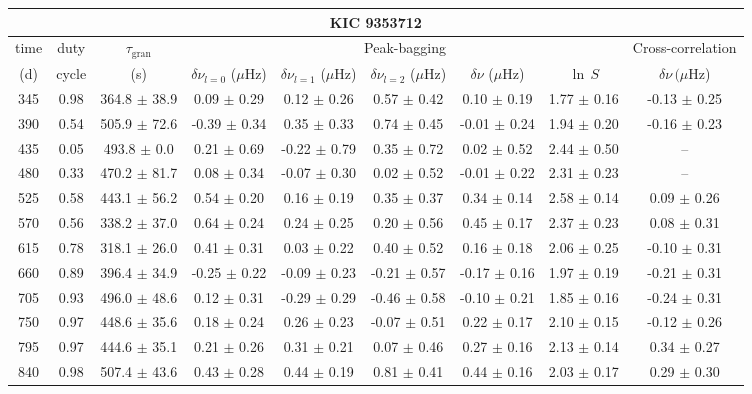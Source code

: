 \documentclass[twocolumn]{aastex61}%
\begin{document}
\begin{table*}[ht]\centering\fontsize{9.}{7.}\selectfont
\begin{tabular}{ccc|ccccc|c}
\multicolumn{9}{c}{KIC 9353712}\\ \hline\hline
time & duty & $\tau_\text{gran}$ &\multicolumn{5}{c|}{Peak-bagging}&Cross-correlation\\
(d)& cycle & (s)&$\delta\nu_{l=0}$ ($\mu$Hz) & $\delta\nu_{l=1}$ ($\mu$Hz) & $\delta\nu_{l=2}$ ($\mu$Hz) & $\delta\nu$ ($\mu$Hz)& $\ln\,S$ & $\delta\nu\,(\mu$Hz)\\\hline
345 & 0.98 & 364.8 $\pm$ 38.9 & 0.09 $\pm$ 0.29 & 0.12 $\pm$ 0.26 & 0.57 $\pm$ 0.42 & 0.10 $\pm$ 0.19 & 1.77 $\pm$ 0.16 & -0.13 $\pm$ 0.25\\
390 & 0.54 & 505.9 $\pm$ 72.6 & -0.39 $\pm$ 0.34 & 0.35 $\pm$ 0.33 & 0.74 $\pm$ 0.45 & -0.01 $\pm$ 0.24 & 1.94 $\pm$ 0.20 & -0.16 $\pm$ 0.23\\
435 & 0.05 & 493.8 $\pm$ 0.0 & 0.21 $\pm$ 0.69 & -0.22 $\pm$ 0.79 & 0.35 $\pm$ 0.72 & 0.02 $\pm$ 0.52 & 2.44 $\pm$ 0.50 & --\\
480 & 0.33 & 470.2 $\pm$ 81.7 & 0.08 $\pm$ 0.34 & -0.07 $\pm$ 0.30 & 0.02 $\pm$ 0.52 & -0.01 $\pm$ 0.22 & 2.31 $\pm$ 0.23 & --\\
525 & 0.58 & 443.1 $\pm$ 56.2 & 0.54 $\pm$ 0.20 & 0.16 $\pm$ 0.19 & 0.35 $\pm$ 0.37 & 0.34 $\pm$ 0.14 & 2.58 $\pm$ 0.14 & 0.09 $\pm$ 0.26\\
570 & 0.56 & 338.2 $\pm$ 37.0 & 0.64 $\pm$ 0.24 & 0.24 $\pm$ 0.25 & 0.20 $\pm$ 0.56 & 0.45 $\pm$ 0.17 & 2.37 $\pm$ 0.23 & 0.08 $\pm$ 0.31\\
615 & 0.78 & 318.1 $\pm$ 26.0 & 0.41 $\pm$ 0.31 & 0.03 $\pm$ 0.22 & 0.40 $\pm$ 0.52 & 0.16 $\pm$ 0.18 & 2.06 $\pm$ 0.25 & -0.10 $\pm$ 0.31\\
660 & 0.89 & 396.4 $\pm$ 34.9 & -0.25 $\pm$ 0.22 & -0.09 $\pm$ 0.23 & -0.21 $\pm$ 0.57 & -0.17 $\pm$ 0.16 & 1.97 $\pm$ 0.19 & -0.21 $\pm$ 0.31\\
705 & 0.93 & 496.0 $\pm$ 48.6 & 0.12 $\pm$ 0.31 & -0.29 $\pm$ 0.29 & -0.46 $\pm$ 0.58 & -0.10 $\pm$ 0.21 & 1.85 $\pm$ 0.16 & -0.24 $\pm$ 0.31\\
750 & 0.97 & 448.6 $\pm$ 35.6 & 0.18 $\pm$ 0.24 & 0.26 $\pm$ 0.23 & -0.07 $\pm$ 0.51 & 0.22 $\pm$ 0.17 & 2.10 $\pm$ 0.15 & -0.12 $\pm$ 0.26\\
795 & 0.97 & 444.6 $\pm$ 35.1 & 0.21 $\pm$ 0.26 & 0.31 $\pm$ 0.21 & 0.07 $\pm$ 0.46 & 0.27 $\pm$ 0.16 & 2.13 $\pm$ 0.14 & 0.34 $\pm$ 0.27\\
840 & 0.98 & 507.4 $\pm$ 43.6 & 0.43 $\pm$ 0.28 & 0.44 $\pm$ 0.19 & 0.81 $\pm$ 0.41 & 0.44 $\pm$ 0.16 & 2.03 $\pm$ 0.17 & 0.29 $\pm$ 0.30\\

\end{tabular}
\end{table*}
\end{document}
